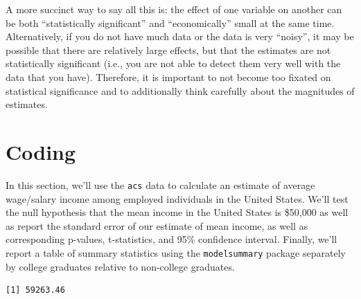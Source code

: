 \documentclass[
  letterpaper,
  DIV=11,
  numbers=noendperiod]{scrreprt}
\newenvironment{Shaded}{\begin{snugshade}}{\end{snugshade}}
\newcommand{\CommentTok}[1]{\textcolor[rgb]{0.37,0.37,0.37}{#1}}
\newcommand{\FunctionTok}[1]{\textcolor[rgb]{0.28,0.35,0.67}{#1}}
\newcommand{\NormalTok}[1]{\textcolor[rgb]{0.00,0.23,0.31}{#1}}
\newcommand{\OtherTok}[1]{\textcolor[rgb]{0.00,0.23,0.31}{#1}}
\newcommand{\SpecialCharTok}[1]{\textcolor[rgb]{0.37,0.37,0.37}{#1}}
\newcommand{\StringTok}[1]{\textcolor[rgb]{0.13,0.47,0.30}{#1}}
\begin{document}
A more succinct way to say all this is: the effect of one variable on
another can be both ``statistically significant'' and ``economically''
small at the same time. Alternatively, if you do not have much data or
the data is very ``noisy'', it may be possible that there are relatively
large effects, but that the estimates are not statistically significant
(i.e., you are not able to detect them very well with the data that you
have). Therefore, it is important to not become too fixated on
statistical significance and to additionally think carefully about the
magnitudes of estimates.

\section{Coding}\label{coding-1}

In this section, we'll use the \texttt{acs} data to calculate an
estimate of average wage/salary income among employed individuals in the
United States. We'll test the null hypothesis that the mean income in
the United States is \$50,000 as well as report the standard error of
our estimate of mean income, as well as corresponding p-values,
t-statistics, and 95\% confidence interval. Finally, we'll report a
table of summary statistics using the \texttt{modelsummary} package
separately by college graduates relative to non-college graduates.

\begin{Shaded}
\end{Shaded}

\begin{verbatim}
[1] 59263.46
\end{verbatim}

\begin{Shaded}
\end{Shaded}
\end{document}
